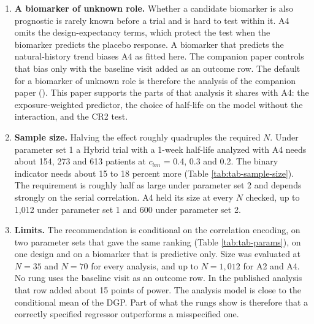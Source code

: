 \documentclass[
  11pt,
]{article}
\begin{document}
\begin{enumerate}
  equivalent to the oracle's within \(\pm 0.01\) in the run with
  independent seeds and in
  2 of the other five families. Against A2,
  the binary indicator with CR2, A4 gains
  0.4 points of power on average in
  the Hybrid cells, and up to 4.1 at
  long half-lives. It loses at most
  1.5 point in the
  13 cells where it is behind. At equal size it is ahead of
  the starting analysis A0 in all four Hybrid cells, by
  2.5 points on average
  (SE 1.9). No
  single difference exceeds two standard errors. Under the crossover
  design use A2 instead. The recommendation is for the test. The A4
  estimate is biased when the selected half-life is wrong, and its
  interval covers below its nominal rate. It should
  therefore not be reported as an estimate with a 95 percent
  interval. We examined dropout of 10 to 30 percent of patients,
  completely at random or dependent on baseline severity. Under it A4
  keeps its size and, in all but one cell, its power advantage over
  the binary indicator. It should be accompanied by an effort to
  retain patients, because heavier missingness costs every analysis
  power.
\item
  \textbf{A biomarker of unknown role.} Whether a candidate biomarker is
  also prognostic is rarely known before a trial and is hard to test
  within it. A4 omits the design-expectancy terms, which protect the
  test when the biomarker predicts the placebo response. A biomarker
  that predicts the natural-history trend biases A4 as fitted here.
  The companion paper controls that bias only with the baseline
  visit added as an outcome row. The default for a biomarker of
  unknown role is therefore the analysis of the companion paper
  (). This paper supports the parts of that
  analysis it shares with A4: the exposure-weighted predictor, the
  choice of half-life on the model without the interaction, and the
  CR2 test.
\item
  \textbf{Sample size.} Halving the effect roughly quadruples the
  required \(N\). Under parameter set 1 a Hybrid trial with a 1-week
  half-life analyzed with A4 needs about
  154,
  273 and
  613 patients at
  \(c_{bm}\) = 0.4, 0.3 and 0.2. The binary indicator needs about
  15 to 18 percent more (Table \ref{tab:tab-sample-size}).
  The requirement is roughly half as large under parameter set 2
  and depends strongly on the serial correlation. A4 held its size
  at every \(N\) checked, up to
  1,012
  under parameter set 1 and
  600
  under parameter set 2.
\item
  \textbf{Limits.} The recommendation is conditional on the correlation
  encoding, on two parameter sets that gave the same ranking (Table
  \ref{tab:tab-params}), on one design and on a biomarker that is
  predictive only. Size was evaluated at \(N = 35\) and \(N = 70\) for
  every analysis, and up to \(N = 1{,}012\) for A2 and A4. No rung uses
  the baseline visit as an
  outcome row. In the published analysis that row added about
  15 points of
  power. The analysis model is close to the conditional mean of the
  DGP. Part of what the rungs show is
  therefore that a correctly specified regressor outperforms a
  misspecified one.
\end{enumerate}
\end{document}
